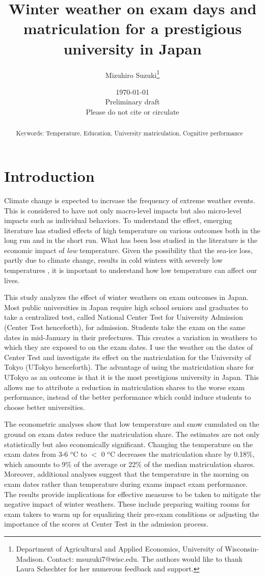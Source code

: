 \documentclass[12pt,letterpaper]{article}
\title{Winter weather on exam days and matriculation for a prestigious university in Japan}%
\author{Mizuhiro Suzuki\thanks{Department of Agricultural and Applied Economics, University of Wisconsin-Madison. Contact: msuzuki7@wisc.edu. The authors would like to thank Laura Schechter for her numerous feedback and support.}}
\date{\today \\ \vspace{1cm} Preliminary draft \\ Please do not cite or circulate}
\begin{document}
  
\maketitle
\begin{abstract}
  \singlespacing
     \noindent 
  
  \medskip
  \vspace{1cm}
 \noindent Keywords: Temperature, Education, University matriculation, Cognitive performance
\end{abstract}

\newpage

\section{Introduction}

Climate change is expected to increase the frequency of extreme weather events.
This is considered to have not only macro-level impacts but also micro-level impacts such as individual behaviors.
To understand the effect, emerging literature has studied effects of high temperature on various outcomes both in the long run and in the short run.
What has been less studied in the literature is the economic impact of \textit{low} temperature.
Given the possibility that the sea-ice loss, partly due to climate change, results in cold winters with severely low temperatures \citep{Kretschmer2016, Kim2014}, it is important to understand how low temperature can affect our lives.

This study analyzes the effect of winter weathers on exam outcomes in Japan.
Most public universities in Japan require high school seniors and graduates to take a centralized test, called National Center Test for University Admission (Center Test henceforth), for admission.
Students take the exam on the same dates in mid-January in their prefectures.
This creates a variation in weathers to which they are exposed to on the exam dates.
I use the weather on the dates of Center Test and investigate its effect on the matriculation for the University of Tokyo (UTokyo henceforth).
The advantage of using the matriculation share for UTokyo as an outcome is that it is the most prestigious university in Japan.
This allows me to attribute a reduction in matriculation shares to the worse exam performance, instead of the better performance which could induce students to choose better universities.

The econometric analyses show that low temperature and snow cumulated on the ground on exam dates reduce the matriculation share.
The estimates are not only statistically but also economically significant.
Changing the temperature on the exam dates from 3-6 $^o$C to $<$ 0 $^o$C decreases the matriculation share by 0.18\%, which amounts to 9\% of the average or 22\% of the median matriculation shares.
Moreover, additional analyses suggest that the temperature in the morning on exam dates rather than temperature during exams impact exam performance. 
The results provide implications for effective measures to be taken to mitigate the negative impact of winter weathers.
These include preparing waiting rooms for exam takers to warm up for equalizing their pre-exam conditions or adjusting the importance of the scores at Center Test in the admission process.
\end{document}
